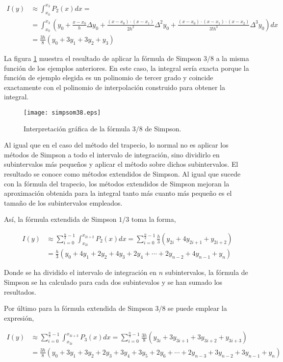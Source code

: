 \begin{align*}
I(y)&\approx \int_{x_0}^{x_3}P_2(x)dx=\\
&=\int_{x_0}^{x_3}\left(y_0+\frac{x-x_0}{h}\Delta y_0+\frac{(x-x_0)\cdot(x-x_1)}{2h^2}\Delta^2 y_0 +\frac{(x-x_0)\cdot(x-x_1)\cdot (x-x_2)}{3!h^3}\Delta^3 y_0\right)dx\\
&= \frac{3h}{8}(y_0+3y_1+3y_2+y_3)
\end{align*}

La figura  \ref{fig:simpsom38} muestra el resultado de aplicar la fórmula de Simpson $3/8$ a la misma función de los ejemplos anteriores. En este caso, la integral sería exacta porque la función de ejemplo elegida es un polinomio de tercer grado y coincide exactamente con el polinomio de interpolación construido para obtener la integral.

\begin{figure}[h]
\centering
\texttt{[image: simpsom38.eps]}
\caption{Interpretación gráfica de la fórmula $3/8$ de Simpson.} 
\label{fig:simpsom38}
\end{figure}

Al igual que en el caso del método del trapecio, lo normal no es aplicar los métodos de Simpson a todo el intervalo de integración, sino dividirlo en subintervalos más pequeños y aplicar el método sobre dichos subintervalos. El resultado se conoce como métodos extendidos de Simpson. Al igual que sucede con la fórmula del trapecio, los métodos extendidos de Simpson mejoran la aproximación obtenida para la integral tanto más cuanto más pequeño es el tamaño de los subintervalos empleados. 

Así, la fórmula extendida de Simpson $1/3$ toma la forma,
 
\begin{align*}
	I(y)&\approx \sum_{i=0}^{\frac{n}{2}-1}\int_{x_{2i}}^{x_{2i+2}}P_2(x)dx=\sum_{i=0}^{\frac{n}{2}-1}\frac{h}{3}(y_{2i}+4y_{2i+1}+y_{2i+2})\\
&= \frac{h}{3}(y_0+4y_1+2y_2+4y_3+2y_4+\cdots + 2y_{n-2}+4y_{n-1}+y_n)
\end{align*}

Donde se ha dividido el intervalo de integración en $n$ subintervalos, la fórmula de Simpson se ha calculado para cada dos subintevalos y se han sumado los resultados.

Por último para la fórmula extendida de Simpson $3/8$ se puede emplear la expresión,

\begin{align*}
	I(y)&\approx \sum_{i=0}^{\frac{n}{3}-1}\int_{x_{3i}}^{x_{3i+3}}P_3(x)dx=\sum_{i=0}^{\frac{n}{3}-1}\frac{3h}{8}(y_{3i}+3y_{3i+1}+3y_{3i+2}+y_{3i+3})\\
&= \frac{3h}{8}(y_0+3y_1+3y_2+2y_3+3y_4+3y_5+2y_6+ \cdots + 2y_{n-3}+3y_{n-2}+3y_{n-1}+y_n)
\end{align*}

